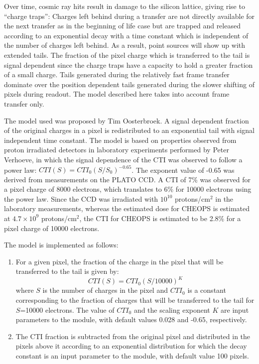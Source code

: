 \documentclass[11pt]{article}      %
\begin{document}
Over time, cosmic ray hits result in damage to the silicon lattice, giving rise to ``charge traps'': Charges left behind during a transfer are not directly available for the next transfer as in the beginning of life case but are trapped and released according to an exponential decay with a time constant which is independent of the number of charges left behind. As a result, point sources will show up with extended tails. The fraction of the pixel charge which is transferred to the tail is signal dependent since the charge traps have a capacity to hold a greater fraction of a small charge. Tails generated during the relatively fast frame transfer dominate over the position dependent tails generated during the slower shifting of pixels during readout. The model described here takes into account frame transfer only.

The model used was proposed by Tim Oosterbroek. A signal dependent fraction of the original charges in a pixel is redistributed to an exponential tail with signal independent time constant. The model is based on properties observed from proton irradiated detectors in laboratory experiments performed by Peter Verhoeve, in which the signal dependence of the CTI was observed to follow a power law: $CTI(S) = CTI_0(S/S_0)^{-0.65}$. The exponent value of -0.65 was derived from measurements on the PLATO CCD. A CTI of 7\% was observed for a pixel charge of 8000 electrons, which translates to 6\% for 10000 electrons using the power law. Since the CCD was irradiated with $10^{10}$ protons/cm$^2$ in the laboratory measurements, whereas the estimated dose for CHEOPS is estimated at $4.7\times10^9$ protons/cm$^2$, the CTI for CHEOPS is estimated to be 2.8\% for a pixel charge of 10000 electrons.

The model is implemented as follows:
\begin{enumerate}
\item For a given pixel, the fraction of the charge in the pixel that will be transferred to the tail is given by:
$$CTI(S) = CTI_0(S/10000)^K$$
where $S$ is the number of charges in the pixel and $CTI_0$ is a constant corresponding to the fraction of charges that will be transferred to the tail for $S$=10000 electrons. The value of $CTI_0$ and the scaling exponent $K$ are input parameters to the module, with default values 0.028 and -0.65, respectively.
\item The CTI fraction is subtracted from the original pixel and distributed in the pixels above it according to an exponential distribution for which the decay constant is an input parameter to the module, with default value 100 pixels.
\end{enumerate}
\end{document}
